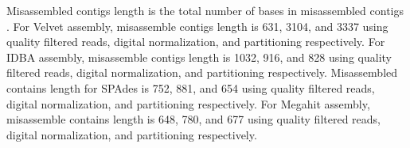 Misassembled contigs length is the total number of bases in misassembled contigs . For Velvet assembly, misassemble contigs length is 631, 3104, and 3337 using quality filtered reads, digital normalization, and partitioning respectively. For IDBA assembly,  misassemble contigs length is 1032, 916, and 828 using quality filtered reads, digital normalization, and partitioning respectively.
Misassembled contains length for SPAdes is 752, 881, and 654  using quality filtered reads, digital normalization, and partitioning respectively. For Megahit assembly, misassemble contains length is 648, 780, and 677 using quality filtered reads, digital normalization, and partitioning respectively.


